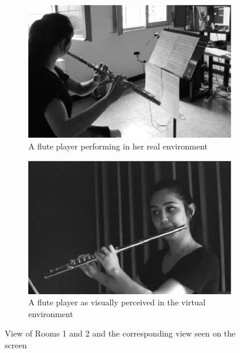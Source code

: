 \begin{figure}[t]
\begin{subfigure}[t]{.48\columnwidth}
	\includegraphics[width=\textwidth]{img/fs.eps}
		\caption{A flute player performing in her real environment}
	\label{subfig:fs}
	\end{subfigure}
	\begin{subfigure}[t]{.48\columnwidth}
	\centering        
	\includegraphics[width=\textwidth]{img/fv.eps}
	\caption{A flute player as visually perceived in the virtual environment}
	\label{subfig:fv}
\end{subfigure}

	\quad 
	\caption{View of Rooms 1 and 2 and the corresponding view seen on the screen}\label{fig:afsv}

\end{figure}

